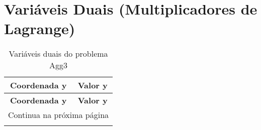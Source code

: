 \documentclass[12pt]{article}
\begin{document}
\section{Variáveis Duais (Multiplicadores de Lagrange)}

\begin{longtable}{@{}cc@{}}
\caption{Variáveis duais do problema Agg3} \\
\toprule
\textbf{Coordenada y} & \textbf{Valor y} \\
\midrule
\endfirsthead

\toprule
\textbf{Coordenada y} & \textbf{Valor y} \\
\midrule
\endhead

\midrule \multicolumn{2}{r}{{Continua na próxima página}} \\ \midrule
\endfoot


\end{longtable}
\end{document}
